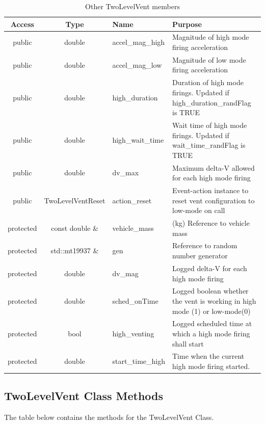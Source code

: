 \documentclass[11pt,fleqn]{report}
\begin{document}
\begin{table}[!h]
    \caption{Other TwoLevelVent members}
    \begin{tabularx}{\textwidth}{|c|c|X|X|} 
    \hline
    \textbf{Access} & \textbf{Type} & \textbf{Name} & \textbf{Purpose} \\
    \hline
    public & double & accel\_mag\_high & Magnitude of high mode firing acceleration \\
    \hline
    public & double & accel\_mag\_low & Magnitude of low mode firing acceleration \\
    \hline
    public & double & high\_duration & Duration of high mode firings. Updated if high\_duration\_randFlag is TRUE \\
    \hline
    public & double & high\_wait\_time & Wait time of high mode firings. Updated if wait\_time\_randFlag is TRUE \\
    \hline
    public & double & dv\_max & Maximum delta-V allowed for each high mode firing \\
    \hline
    public & TwoLevelVentReset & action\_reset & Event-action instance to reset vent configuration to low-mode on call \\
    \hline
    protected & const double \& & vehicle\_mass & (kg) Reference to vehicle mass \\
    \hline
    protected & std::mt19937 \& & gen & Reference to random number generator \\
    \hline
    protected & double & dv\_mag & Logged delta-V for each high mode firing \\
    \hline
    protected & double & sched\_onTime & Logged boolean whether the vent is working in high mode (1) or low-mode(0) \\
    \hline
    protected & bool & high\_venting & Logged scheduled time at which a high mode firing shall start \\
    \hline
    protected & double & start\_time\_high & Time when the current high mode firing started. \\
    \hline
    \end{tabularx}
\end{table}


\subsection{TwoLevelVent Class Methods}

\noindent The table below contains the methods for the TwoLevelVent Class.
\end{document}

